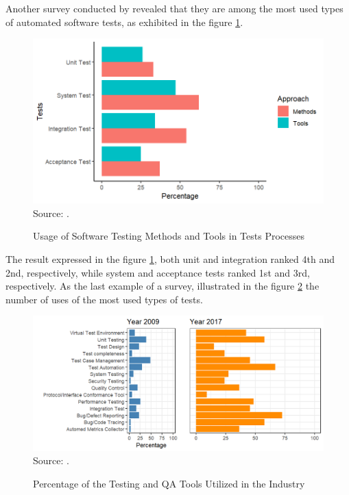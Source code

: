 Another survey conducted by \cite{lee2012survey} revealed that they are among the most used types of automated software tests, as exhibited in the figure \ref{fig:usage_stmt_tests_processes}.

\begin{figure}[H]
    \centering
    \caption{Usage of Software Testing Methods and Tools in Tests Processes}
    \includegraphics[width=0.8\linewidth]{figures/tests/usage_stmt_tests_processes.png}
    \label{fig:usage_stmt_tests_processes}
    \\ \footnotesize Source: \cite{lee2012survey}.
\end{figure}

The result expressed in the figure \ref{fig:usage_stmt_tests_processes}, both unit and integration ranked 4th and 2nd, respectively, while system and acceptance tests ranked 1st and 3rd, respectively. As the last example of a survey, \cite{hynninen2023development} illustrated in the figure \ref{fig:testing_tools_2017_2009} the number of uses of the most used types of tests.

\begin{figure}[H]
    \centering
    \caption{Percentage of the Testing and QA Tools Utilized in the Industry}
    \includegraphics[width=0.8\linewidth]{figures/tests/testing_tools_2017_2009.png}
    \label{fig:testing_tools_2017_2009}
    \\ \footnotesize Source: \cite{hynninen2023development, kasurinen2010software}.
\end{figure}

